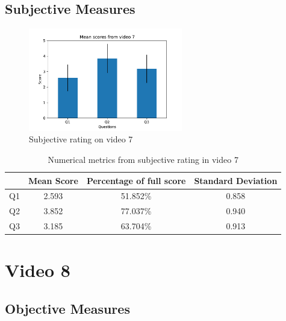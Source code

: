 \subsection{Subjective Measures}

\begin{figure}[H]
    \centering
    \includegraphics[width=0.6\textwidth]{img/subjective_measures/analysis/video_7.pdf}
    \caption{Subjective rating on video 7}
    \label{fig:visual_subj_vid7}
\end{figure}

\begin{table}[H]
    \centering
    \begin{tabular}{|c|c c c|} 
        \hline
           & \textbf{Mean Score} & \textbf{Percentage of full score} & \textbf{Standard Deviation} \\ [0.5ex] 
        \hline
        Q1 & 2.593 & 51.852\% & 0.858 \\ [1ex] 
        Q2 & 3.852 & 77.037\% & 0.940 \\ [1ex] 
        Q3 & 3.185 & 63.704\% & 0.913 \\ [1ex] 
        \hline
    \end{tabular}
    \caption{Numerical metrics from subjective rating in video 7}
    \label{tab:numerical_subj_vid7}
\end{table}



\section{Video 8}
\subsection{Objective Measures}

